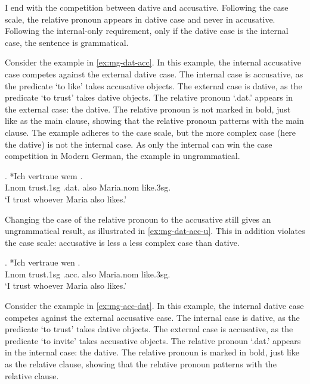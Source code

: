 I end with the competition between dative and accusative. Following the case scale, the relative pronoun appears in dative case and never in accusative. Following the internal-only requirement, only if the dative case is the internal case, the sentence is grammatical.

Consider the example in \ref{ex:mg-dat-acc}. In this example, the internal accusative case competes against the external dative case.
The internal case is accusative, as the predicate  `to like' takes accusative objects.
The external case is dative, as the predicate  `to trust' takes dative objects.
The relative pronoun  `.\ac{dat}.' appears in the external case: the dative. The relative pronoun is not marked in bold, just like as the main clause, showing that the relative pronoun patterns with the main clause.
The example adheres to the case scale, but the more complex case (here the dative) is not the internal case. As only the internal can win the case competition in Modern German, the example in ungrammatical.

\exg. *Ich vertraue wem   . \\
I.\ac{nom} trust.1\ac{sg}\scsub{[dat]} .\ac{dat}. also Maria.\ac{nom} like.3\ac{sg}\scsub{[acc]}.\\
`I trust whoever Maria also likes.' \label{ex:mg-dat-acc}

Changing the case of the relative pronoun to the accusative still gives an ungrammatical result, as illustrated in \ref{ex:mg-dat-acc-u}. This in addition violates the case scale: accusative is less a less complex case than dative.

\exg. *Ich vertraue wen   . \\
I.\ac{nom} trust.1\ac{sg}\scsub{[dat]} .\ac{acc}. also Maria.\ac{nom} like.3\ac{sg}\scsub{[acc]}.\\
`I trust whoever Maria also likes.' \label{ex:mg-dat-acc-u}

Consider the example in \ref{ex:mg-acc-dat}. In this example, the internal dative case competes against the external accusative case.
The internal case is dative, as the predicate  `to trust' takes dative objects.
The external case is accusative, as the predicate  `to invite' takes accusative objects.
The relative pronoun  `.\ac{dat}.' appears in the internal case: the dative. The relative pronoun is marked in bold, just like as the relative clause, showing that the relative pronoun patterns with the relative clause.

